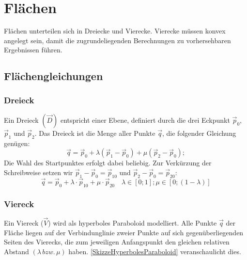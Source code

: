 \section{Flächen}
Flächen unterteilen sich in Dreiecke und Vierecke. Vierecke müssen konvex angelegt sein, damit die zugrundeliegenden Berechnungen zu vorhersehbaren Ergebnissen führen.

\subsection{Flächengleichungen}
\subsubsection{Dreieck}Ein Dreieck $(\vec{D})$ entspricht einer Ebene, definiert durch die drei Eckpunkt $\vec{p}_{0}$, $\vec{p}_{1}$ und $\vec{p}_{2}$. Das Dreieck ist die Menge aller  Punkte $\vec{q}$, die folgender Gleichung genügen:
\begin{equation*}
	\vec{q}=\vec{p}_{0} + \lambda (\vec{p}_{1} - \vec{p}_{0}) + \mu (\vec{p}_{2} - \vec{p}_{0});
\end{equation*}
Die Wahl des Startpunktes erfolgt dabei beliebig. Zur Verkürzung der Schreibweise setzen wir $\vec{p}_{1} - \vec{p}_{0} = \vec{p}_{10}$ und $\vec{p}_{2} - \vec{p}_{0} = \vec{p}_{20}$:
\begin{equation}
	\label{GleichungDreieck}
	\boxed{ \vec{q}=\vec{p}_{0} + \lambda \cdot \vec{p}_{10} + \mu \cdot \vec{p}_{20} } \quad \lambda \in [0;1]; \mu \in [0;(1-\lambda)]
\end{equation}

\subsubsection{Viereck}Ein Viereck ($\vec{V}$) wird als hyperboles Paraboloid modelliert. Alle Punkte $\vec{q}$ der Fläche liegen auf der Verbindunglinie zweier Punkte auf sich gegenüberliegenden Seiten des Vierecks, die zum jeweiligen Anfangspunkt den gleichen relativen Abstand $(\lambda \, bzw.\, \mu)$ haben. \cref{SkizzeHyperbolesParaboloid} veranschaulicht dies.

